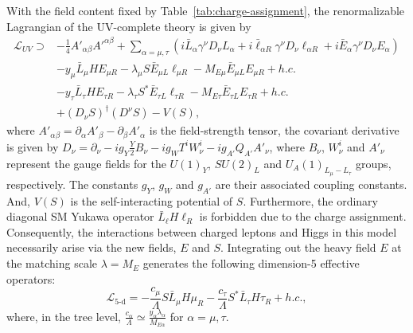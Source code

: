 \documentclass[onecolumn, aps, nofootinbib, prd, preprint, floats, floatfix, amsmath, amssymb, superscriptaddress, preprintnumbers]{revtex4-2}
\begin{document}
With the field content fixed by Table~\ref{tab:charge-assignment}, the renormalizable Lagrangian of the UV-complete theory is given by
\begin{equation}\label{eq:Lagrangian}
\begin{aligned}
\mathcal{L}_{UV}\supset& -\frac{1}{4}A'_{\alpha\beta}A'^{\alpha\beta}+\sum_{\alpha=\mu,\tau}\left(i\bar{L}_\alpha \gamma^\nu D_{\nu} L_\alpha + i\bar{\ell}_{\alpha R} \gamma^\nu D_{\nu}\ell_{\alpha R} + i\bar{E}_{\alpha}\gamma^\nu D_{\nu} E_{\alpha}\right)  \\
& -y_\mu \bar L_\mu H E_{\mu R} -\lambda_\mu S \bar E_{\mu L}\ell_{\mu R} -M_{E\mu}\bar E_{\mu L}E_{\mu R} + h.c.\\
&-y_\tau \bar L_\tau H E_{\tau R} -\lambda_\tau S^{*}\bar E_{\tau L}\ell_{\tau R} -M_{E\tau}\bar E_{\tau L}E_{\tau R} + h.c.\\
&+ (D_{\nu}S)^\dagger (D^{\nu}S) - V(S),
\end{aligned}
\end{equation}
where $A'_{\alpha\beta}=\partial_\alpha A'_\beta - \partial_\beta A'_\alpha$ is the field-strength tensor, the covariant derivative is given by $D_\nu = \partial_\nu -ig_Y \frac{Y}{2}B_\nu  -ig_W T^iW_\nu^i - ig_{A'} Q_{A'} A'_\nu$, where $B_\nu$, $W_\nu^i$ and $A'_\nu$ represent the gauge fields for the ${U(1)}_Y$, ${SU(2)}_L$ and ${U_A(1)}_{L_\mu-L_\tau}$ groups, respectively. The constants $g_Y$, $g_W$ and $g_{A'}$ are their associated coupling constants. And, $V(S)$ is the self-interacting potential of $S$. Furthermore, the ordinary diagonal SM Yukawa operator $\bar L_\ell H\ell_R$ is forbidden due to the charge assignment. Consequently, the interactions between charged leptons and Higgs in this model necessarily arise via the new fields, $E$ and $S$. Integrating out the heavy field $E$ at the matching scale $\lambda=M_E$ generates the following dimension-5 effective operators:
\begin{equation}\label{eq:5-d}
    \mathcal{L}_{\text{5-d}} =
    -\frac{c_\mu}{\Lambda} S \bar{L}_\mu H\mu_R
    -\frac{c_\tau}{\Lambda} S^* \bar{L}_\tau H\tau_R
    +h.c.,
\end{equation}
where, in the tree level, $\frac{c_\alpha}{\Lambda}\simeq \frac{y_\alpha \lambda_\alpha}{M_{E\alpha }}$ for $\alpha=\mu,\tau$.
\end{document}
